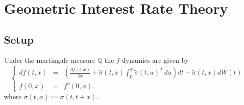 \newpage
\chapter{Geometric Interest Rate Theory}
\section{Setup}
\setcounter{propos}{5}
\begin{propos} Under the martingale
  measure $\mathbb{Q}$ the $f$-dynamics are given by
\begin{equation}
\label{eqHJMM:2}
\left\{
\begin{array}{rcl}
df(t,x)& = & \left( \frac{\partial f(t,x)}{\partial x}+
  \widetilde\sigma(t,x)\displaystyle \int_0^x \widetilde\sigma(t,u)^T
  \,du\right) dt + \widetilde\sigma(t,x)dW (t) \\  
f(0,x) & = & f^o(0,x).
\end{array}
\right.
\end{equation}
where $\widetilde \sigma(t,x):=\sigma(t,t+x)$.
\end{propos}
